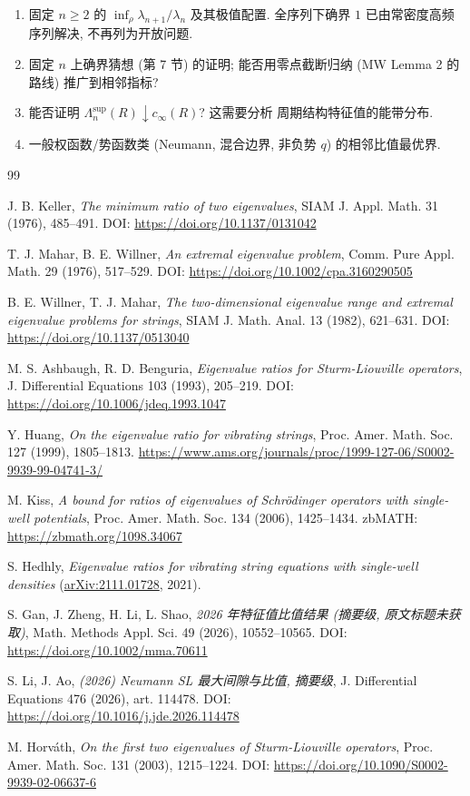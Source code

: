 \documentclass[UTF8]{ctexart}
\begin{document}
\begin{enumerate}
	\item 固定 $n\ge2$ 的 $\inf_{\rho}\lambda_{n+1}/\lambda_n$ 及其极值配置.
		全序列下确界 $1$ 已由常密度高频序列解决, 不再列为开放问题.
	\item 固定 $n$ 上确界猜想 (第 7 节) 的证明; 能否用零点截断归纳 (MW Lemma 2 的路线) 推广到相邻指标?
	\item 能否证明 $\Lambda_n^{\sup}(R) \downarrow c_{\infty}(R)$? 这需要分析
		周期结构特征值的能带分布.
	\item 一般权函数/势函数类 (Neumann, 混合边界, 非负势 $q$) 的相邻比值最优界.
\end{enumerate}

\begin{thebibliography}{99}

 J. B. Keller, \emph{The minimum ratio of two eigenvalues},
	SIAM J. Appl. Math. 31 (1976), 485--491.
	DOI: \url{https://doi.org/10.1137/0131042}

 T. J. Mahar, B. E. Willner, \emph{An extremal eigenvalue problem},
	Comm. Pure Appl. Math. 29 (1976), 517--529.
	DOI: \url{https://doi.org/10.1002/cpa.3160290505}

 B. E. Willner, T. J. Mahar, \emph{The two-dimensional eigenvalue range
	and extremal eigenvalue problems for strings}, SIAM J. Math. Anal. 13 (1982), 621--631.
	DOI: \url{https://doi.org/10.1137/0513040}

 M. S. Ashbaugh, R. D. Benguria, \emph{Eigenvalue ratios for Sturm-Liouville
	operators}, J. Differential Equations 103 (1993), 205--219.
	DOI: \url{https://doi.org/10.1006/jdeq.1993.1047}

 Y. Huang, \emph{On the eigenvalue ratio for vibrating strings},
	Proc. Amer. Math. Soc. 127 (1999), 1805--1813.
	\url{https://www.ams.org/journals/proc/1999-127-06/S0002-9939-99-04741-3/}

 M. Kiss, \emph{A bound for ratios of eigenvalues of Schr\"odinger operators
	with single-well potentials}, Proc. Amer. Math. Soc. 134 (2006), 1425--1434.
	zbMATH: \url{https://zbmath.org/1098.34067}

 S. Hedhly, \emph{Eigenvalue ratios for vibrating string equations with single-well densities} (\href{https://arxiv.org/abs/2111.01728}{arXiv:2111.01728}, 2021).



 S. Gan, J. Zheng, H. Li, L. Shao, \emph{2026 年特征值比值结果 (摘要级, 原文标题未获取)}, Math. Methods Appl. Sci. 49 (2026), 10552--10565. DOI: \url{https://doi.org/10.1002/mma.70611}



 S. Li, J. Ao, \emph{(2026) Neumann SL 最大间隙与比值, 摘要级},
	J. Differential Equations 476 (2026), art. 114478.
	DOI: \url{https://doi.org/10.1016/j.jde.2026.114478}

 M. Horv\'ath, \emph{On the first two eigenvalues of Sturm-Liouville
	operators}, Proc. Amer. Math. Soc. 131 (2003), 1215--1224.
	DOI: \url{https://doi.org/10.1090/S0002-9939-02-06637-6}

\end{thebibliography}
\end{document}
